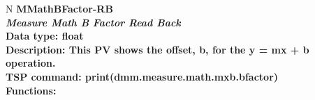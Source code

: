\documentclass[openany]{article}
\begin{document}
		\begin{tabular}{N}
			\hline
			\bfseries MMathBFactor-RB\label{pv:mmathbfactor-rb} \\ \hline
			\emph{Measure Math B Factor Read Back} \\
			Data type: float \\
			Description: This PV shows the offset, b, for the y = mx + b operation. \\
			TSP command: print(dmm.measure.math.mxb.bfactor) \\
			Functions: \\
			\arrayrulecolor{\FuncTableBorderColor}

		\end{tabular}
\end{document}
